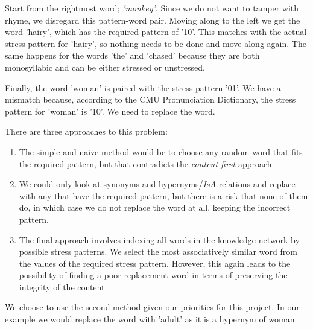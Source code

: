 Start from the rightmost word; \textit{'monkey'}. Since we do not want to tamper with rhyme, we disregard this pattern-word pair. Moving along to the left we get the word 'hairy', which has the required pattern of '10'. This matches with the actual stress pattern for 'hairy', so nothing needs to be done and move along again. The same happens for the words 'the' and 'chased' because they are both monosyllabic and can be either stressed or unstressed.

Finally, the word 'woman' is paired with the stress pattern '01'. We have a mismatch because, according to the CMU Pronunciation Dictionary, the stress pattern for 'woman' is '10'. We need to replace the word.

There are three approaches to this problem:
\begin{enumerate}
\item{The simple and naive method would be to choose any random word that fits the required pattern, but that contradicts the \textit{content first} approach.} 
\item{We could only look at synonyms and hypernyms/\textit{IsA} relations and replace with any that have the required pattern, but there is a risk that none of them do, in which case we do not replace the word at all, keeping the incorrect pattern.} 
\item{The final approach involves indexing all words in the knowledge network by possible stress patterns. We select the most associatively similar word from the values of the required stress pattern. However, this again leads to the possibility of finding a poor replacement word in terms of preserving the integrity of the content.}
\end{enumerate}

We choose to use the second method given our priorities for this project. In our example we would replace the word with 'adult' as it is a hypernym of woman.





